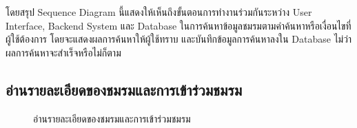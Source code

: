 \documentclass[14pt,oneside,openright,a4paper]{cpe-thai-project}
\begin{document}
  โดยสรุป Sequence Diagram นี้แสดงให้เห็นถึงขั้นตอนการทำงานร่วมกันระหว่าง User Interface, Backend System และ Database ในการค้นหาข้อมูลชมรมตามคำค้นหาหรือเงื่อนไขที่ผู้ใช้ต้องการ โดยจะแสดงผลการค้นหาให้ผู้ใช้ทราบ และบันทึกข้อมูลการค้นหาลงใน Database ไม่ว่าผลการค้นหาจะสำเร็จหรือไม่ก็ตาม

  \newpage

\subsection{อ่านรายละเอียดของชมรมและการเข้าร่วมชมรม}

  \begin{figure}[!h]\centering
    \setlength{\fboxrule}{0.5mm} %
    \setlength{\fboxsep}{0.5cm}
    \caption{อ่านรายละเอียดของชมรมและการเข้าร่วมชมรม}\label{fig:Select and join club}
  \end{figure}
\end{document}
